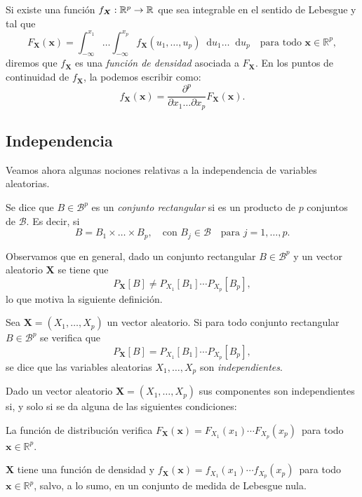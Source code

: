 \begin{ndef}
    Si existe una función $f_{\boldsymbol X} : \mathbb{R}^p \to \mathbb{R}$ que sea integrable en el sentido de Lebesgue y tal que
    \[
    F_{\boldsymbol X}(\boldsymbol x) = \int^{x_1}_{-\infty} \dots \int^{x_p}_{-\infty} f_{\boldsymbol X}(u_1, \dots,  u_p) \mathop{}\!\mathrm{d}u_1 \dots \mathop{}\!\mathrm{d}u_p\quad \text{para todo } \boldsymbol  x \in \mathbb{R}^p
    ,\]
    diremos que $f_{\boldsymbol X}$ es una \emph{función de densidad} asociada a  $F_{\boldsymbol X}$. En los puntos de continuidad de $f_{\boldsymbol X}$, la podemos escribir como:
    \[
    f_{\boldsymbol X}(\boldsymbol x) = \frac{\partial^p}{\partial x_1 \dots \partial x_p} F_{\boldsymbol X}(\boldsymbol x)
    .\]
\end{ndef}

\subsection{Independencia}

Veamos ahora algunas nociones relativas a la independencia de variables aleatorias.

\begin{ndef}
  Se dice que $B\in \mathscr{B}^p$ es un \emph{conjunto rectangular} si es un producto de $p$ conjuntos de $\mathscr{B}$. Es decir, si
\[
    B = B_1 \times \dots \times B_p,\quad\text{con }B_j \in \mathscr{B} \quad\text{para } j = 1, \dots, p
.\]
\end{ndef}

Observamos que en general, dado un conjunto rectangular $B \in \mathscr{B}^p$ y un vector aleatorio $\boldsymbol X$ se tiene que
\[
P_{\boldsymbol X}[B] \neq P_{X_1}[B_1] \cdots  P_{X_p}[B_p],
\]
lo que motiva la siguiente definición.

\begin{ndef}[Independencia]
    Sea $\boldsymbol X = (X_1, \dots, X_p)$ un vector aleatorio. Si para todo conjunto rectangular $B \in \mathscr{B}^p$ se verifica que \[
      P_{\boldsymbol X}[B] = P_{X_1}[B_1] \cdots  P_{X_p}[B_p],
      \] se dice que las variables aleatorias \(X_1, \dots, X_p\) son \emph{independientes}.
\end{ndef}

\begin{nprop}
  Dado un vector aleatorio $\boldsymbol X = (X_1, \dots, X_p)$ sus componentes son independientes si, y solo si se da alguna de las siguientes condiciones:
  \begin{nlist}
  \item La función de distribución verifica $F_{\boldsymbol X} (\boldsymbol x) = F_{X_1} (x_1) \cdots F_{X_p}(x_p)\,$ para todo \(\boldsymbol x \in \mathbb{R}^p\).
   \item $\boldsymbol X$ tiene una función de densidad y \(f_{\boldsymbol X} (\boldsymbol x) = f_{X_1}(x_1) \cdots f_{X_p}(x_p)\,\) para todo \(\boldsymbol x \in \mathbb{R}^p\), salvo, a lo sumo, en un conjunto de medida de Lebesgue nula.
  \end{nlist}
\end{nprop}

